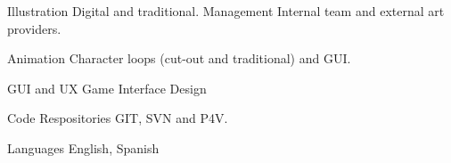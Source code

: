 

\begin{cvskills}

  \cvskill
    {Illustration} %
    {Digital and traditional.} %
  \cvskill
    {Management} %
    {Internal team and external art providers.} %

  \cvskill
    {Animation} %
    {Character loops (cut-out and traditional) and GUI.} %

  \cvskill
    {GUI and UX} %
    {Game Interface Design} %


  \cvskill
    {Code Respositories} %
    {GIT, SVN and P4V.} %


  \cvskill
    {Languages} %
    {English, Spanish} %

\end{cvskills}
